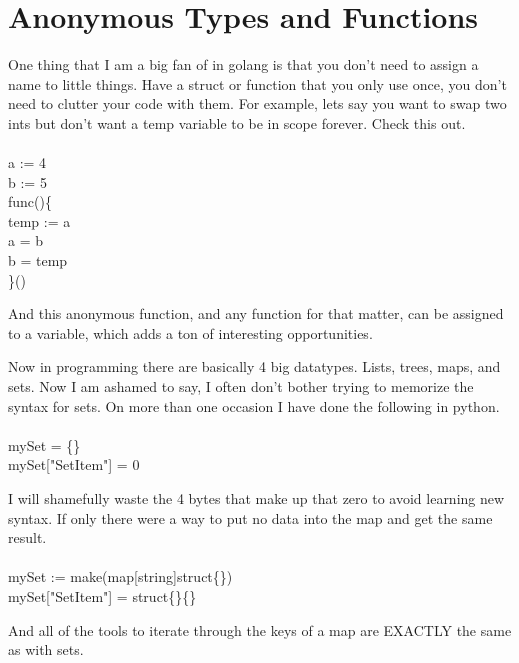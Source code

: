 \documentclass[12pt]{article}
\newcommand{\quest}[1]{\textcolor{dank}{#1}}
\newcommand{\ta}[0]{\hspace*{5mm}}
\begin{document}
\section{Anonymous Types and Functions}
One thing that I am a big fan of in golang is that you don't need to assign a name to little things. Have a struct or function that you only use once, you don't need to clutter your code with them. For example, lets say you want to swap two ints but don't want a temp variable to be in scope forever. Check this out. \\\\
\quest{
a := 4\\
b := 5\\
func()\{\\
\ta temp := a \\
\ta a = b\\
\ta b = temp\\
\}()\\
}
\par And this anonymous function, and any function for that matter, can be assigned to a variable, which adds a ton of interesting opportunities. 
\par Now in programming there are basically 4 big datatypes. Lists, trees, maps, and sets. Now I am ashamed to say, I often don't bother trying to memorize the syntax for sets. On more than one occasion I have done the following in python. \\\\
\quest{
mySet = \{\}\\
mySet["SetItem"] = 0\\
}
\par I will shamefully waste the 4 bytes that make up that zero to avoid learning new syntax. If only there were a way to put no data into the map and get the same result. \\\\
\quest{
mySet := make(map[string]struct\{\})\\ 
mySet["SetItem"] = struct\{\}\{\}\\
}
\par And all of the tools to iterate through the keys of a map are EXACTLY the same as with sets.
\end{document}
